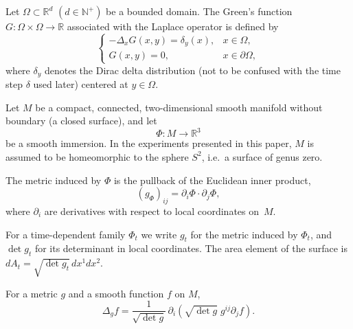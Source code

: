 \documentclass[
]{elteiktdk}[2024/04/26]
\begin{document}
	\begin{definition}
		Let $\Omega \subset \mathbb{R}^d$ $(d \in \mathbb{N^+})$ be a bounded domain.
		The Green's function $G: \Omega \times \Omega \rightarrow
		\mathbb{R}$ associated with the Laplace operator is defined by
		\begin{equation}
			\begin{cases}
				-\Delta_x G(x,y) = \delta_y(x),
				& x \in \Omega,\\
				G(x,y) = 0,
				& x \in \partial\Omega,
			\end{cases}
		\end{equation}
		where $\delta_y$ denotes the Dirac delta distribution (not to be confused with the time step $\delta$ used later)
		centered at $y \in \Omega$.
	\end{definition}

	\begin{definition} 
		Let \(M\) be a compact, connected, two-dimensional smooth manifold without boundary (a closed surface), and let
		\[
		\Phi:M\to\mathbb{R}^3
		\]
		be a smooth immersion. In the experiments presented in this paper, \(M\) is assumed to be homeomorphic to the sphere \(S^2\), i.e.\ a surface of genus zero.
	\end{definition}
	
	\begin{definition}
		The metric induced by $\Phi$ is the pullback of the Euclidean inner product,
		\begin{equation}
			(g_\Phi)_{ij} = \partial_i\Phi\cdot\partial_j\Phi ,
		\end{equation}
		where $\partial_i$ are derivatives with respect to local coordinates on~$M$.
	\end{definition}
	
	For a time-dependent family $\Phi_t$ we write $g_t$ for the metric induced
	by $\Phi_t$, and $\det g_t$ for its determinant in local coordinates.
	The area element of the surface is $dA_t = \sqrt{\det g_t}\,dx^1 dx^2$.
	
	\begin{definition}
		\label{lb}
		For a metric $g$ and a smooth function $f$ on $M$,
		\begin{equation}
			\Delta_g f = \frac{1}{\sqrt{\det g}}\,
			\partial_i\!\left(\sqrt{\det g}\; g^{ij}\partial_j f\right).
		\end{equation}
	\end{definition}
\end{document}

